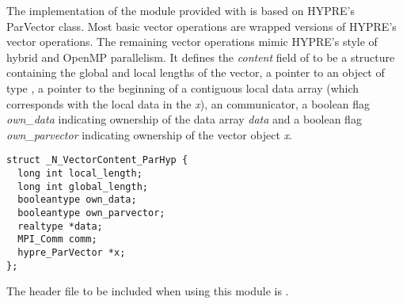 %
The {\nvecph} implementation of the {\nvector} module provided with
{\sundials} is based on HYPRE's ParVector class. Most basic vector operations are 
wrapped versions of HYPRE's vector operations. The remaining vector operations 
mimic HYPRE's style of hybrid {\mpi} and OpenMP parallelism.  It
defines the {\em content} field of  to be a structure
containing the global and local lengths of the vector, a pointer to an
object of type , a pointer to the beginning of a
contiguous local data array (which corresponds with the local data in
the  {\em x}), an {\mpi} communicator, a boolean
flag {\em own\_data} indicating ownership of the data array {\em data}
and a boolean flag {\em own\_parvector} indicating ownership of the
vector object {\em x}.
\begin{verbatim}
struct _N_VectorContent_ParHyp {
  long int local_length;
  long int global_length;
  booleantype own_data;
  booleantype own_parvector;
  realtype *data;
  MPI_Comm comm;
  hypre_ParVector *x;
};
\end{verbatim}

The header file to be included when using this module is .

